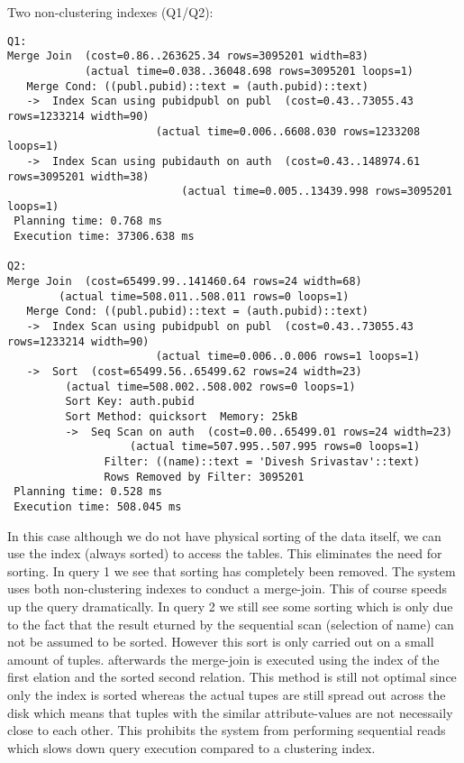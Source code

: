 \documentclass[11pt]{scrartcl}
\begin{document}
\noindent Two non-clustering indexes (Q1/Q2):
{\small
\begin{verbatim}
Q1:
Merge Join  (cost=0.86..263625.34 rows=3095201 width=83)
            (actual time=0.038..36048.698 rows=3095201 loops=1)
   Merge Cond: ((publ.pubid)::text = (auth.pubid)::text)
   ->  Index Scan using pubidpubl on publ  (cost=0.43..73055.43 rows=1233214 width=90)
					   (actual time=0.006..6608.030 rows=1233208 loops=1)
   ->  Index Scan using pubidauth on auth  (cost=0.43..148974.61 rows=3095201 width=38)
				           (actual time=0.005..13439.998 rows=3095201 loops=1)
 Planning time: 0.768 ms
 Execution time: 37306.638 ms

Q2:
Merge Join  (cost=65499.99..141460.64 rows=24 width=68)
	    (actual time=508.011..508.011 rows=0 loops=1)
   Merge Cond: ((publ.pubid)::text = (auth.pubid)::text)
   ->  Index Scan using pubidpubl on publ  (cost=0.43..73055.43 rows=1233214 width=90)
					   (actual time=0.006..0.006 rows=1 loops=1)
   ->  Sort  (cost=65499.56..65499.62 rows=24 width=23)
	     (actual time=508.002..508.002 rows=0 loops=1)
         Sort Key: auth.pubid
         Sort Method: quicksort  Memory: 25kB
         ->  Seq Scan on auth  (cost=0.00..65499.01 rows=24 width=23)
			       (actual time=507.995..507.995 rows=0 loops=1)
               Filter: ((name)::text = 'Divesh Srivastav'::text)
               Rows Removed by Filter: 3095201
 Planning time: 0.528 ms
 Execution time: 508.045 ms
\end{verbatim}
In this case although we do not have physical sorting of the data itself, we can use the index (always sorted) to access the tables. This eliminates the need for sorting.
In query 1 we see that sorting has completely been removed. The system uses both non-clustering indexes to conduct a merge-join. This of course speeds up the query dramatically.
In query 2 we still see some sorting which is only due to the fact that the result eturned by the sequential scan (selection of name) can not be assumed to be sorted. However this sort
is only carried out on a small amount of tuples. afterwards the merge-join is executed using the index of the first elation and the sorted second relation.
This method is still not optimal since only the index is sorted whereas the actual tupes are still spread out across the disk which means that tuples with the similar attribute-values are not necessaily
close to each other. This prohibits the system from performing sequential reads which slows down query execution compared to a clustering index.
}
\end{document}
